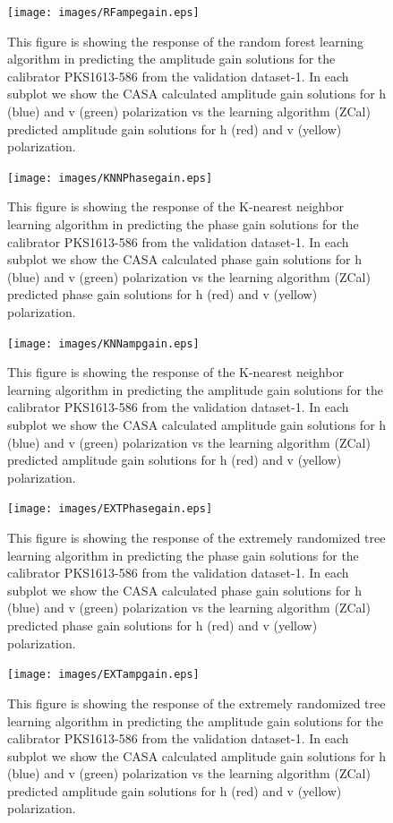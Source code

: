 \begin{figure}[H]
    \texttt{[image: images/RFampegain.eps]}
    \caption{This figure is showing the response of the random forest learning algorithm in predicting the amplitude gain solutions for the calibrator PKS1613-586 from the validation dataset-1. In each subplot we show the CASA calculated amplitude gain solutions for h (blue) and v (green) polarization vs the learning algorithm (ZCal) predicted amplitude gain solutions for h (red) and v (yellow) polarization.}
     \label{ra1}
\end{figure}

\begin{figure}[H]
    \texttt{[image: images/KNNPhasegain.eps]}
    \caption{This figure is showing the response of the K-nearest neighbor learning algorithm in predicting the phase gain solutions for the calibrator PKS1613-586 from the validation dataset-1. In each subplot we show the CASA calculated phase gain solutions for h (blue) and v (green) polarization vs the learning algorithm (ZCal) predicted phase gain solutions for h (red) and v (yellow) polarization.}
    \label{obs3}
\end{figure}

\begin{figure}[H]
    \texttt{[image: images/KNNampgain.eps]}
    \caption{This figure is showing the response of the K-nearest neighbor learning algorithm in predicting the amplitude gain solutions for the calibrator PKS1613-586 from the validation dataset-1. In each subplot we show the CASA calculated amplitude gain solutions for h (blue) and v (green) polarization vs the learning algorithm (ZCal) predicted amplitude gain solutions for h (red) and v (yellow) polarization.}
     \label{ka1}
\end{figure}

\begin{figure}[H]
    \texttt{[image: images/EXTPhasegain.eps]}
    \caption{This figure is showing the response of the extremely randomized tree learning algorithm in predicting the phase gain solutions for the calibrator PKS1613-586 from the validation dataset-1. In each subplot we show the CASA calculated phase gain solutions for h (blue) and v (green) polarization vs the learning algorithm (ZCal) predicted phase gain solutions for h (red) and v (yellow) polarization.}
    \label{obs4}
\end{figure}

\begin{figure}[H]
    \texttt{[image: images/EXTampgain.eps]}
    \caption{This figure is showing the response of the extremely randomized tree learning algorithm in predicting the amplitude gain solutions for the calibrator PKS1613-586 from the validation dataset-1. In each subplot we show the CASA calculated amplitude gain solutions for h (blue) and v (green) polarization vs the learning algorithm (ZCal) predicted amplitude gain solutions for h (red) and v (yellow) polarization.}
     \label{ea1}
\end{figure}

